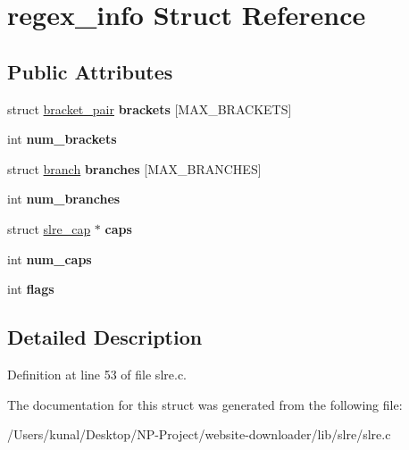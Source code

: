 \hypertarget{structregex__info}{}\section{regex\+\_\+info Struct Reference}
\label{structregex__info}
\subsection*{Public Attributes}
\begin{DoxyCompactItemize}
\item 
\mbox{\label{structregex__info_ab4330a8a5c68eae2a3edaac507577484}} 
struct \hyperlink{structbracket__pair}{bracket\+\_\+pair} {\bfseries brackets} \mbox{[}M\+A\+X\+\_\+\+B\+R\+A\+C\+K\+E\+TS\mbox{]}
\item 
\mbox{\label{structregex__info_af06c02b12b83d1422d96e4b61fb5527b}} 
int {\bfseries num\+\_\+brackets}
\item 
\mbox{\label{structregex__info_ad89dc14885d7d57d7057dece85366c6b}} 
struct \hyperlink{structbranch}{branch} {\bfseries branches} \mbox{[}M\+A\+X\+\_\+\+B\+R\+A\+N\+C\+H\+ES\mbox{]}
\item 
\mbox{\label{structregex__info_a268c4effec2e19314cea9c5cd3a6eeec}} 
int {\bfseries num\+\_\+branches}
\item 
\mbox{\label{structregex__info_a596550fe4047d52c7a5e77044b08dcb0}} 
struct \hyperlink{structslre__cap}{slre\+\_\+cap} $\ast$ {\bfseries caps}
\item 
\mbox{\label{structregex__info_aec4535d67d4ceffa08f77680b9e679d1}} 
int {\bfseries num\+\_\+caps}
\item 
\mbox{\label{structregex__info_a8dff8748edc57114491fd16808f3cbd3}} 
int {\bfseries flags}
\end{DoxyCompactItemize}


\subsection{Detailed Description}


Definition at line 53 of file slre.\+c.



The documentation for this struct was generated from the following file\+:\begin{DoxyCompactItemize}
\item 
/\+Users/kunal/\+Desktop/\+N\+P-\/\+Project/website-\/downloader/lib/slre/slre.\+c\end{DoxyCompactItemize}
